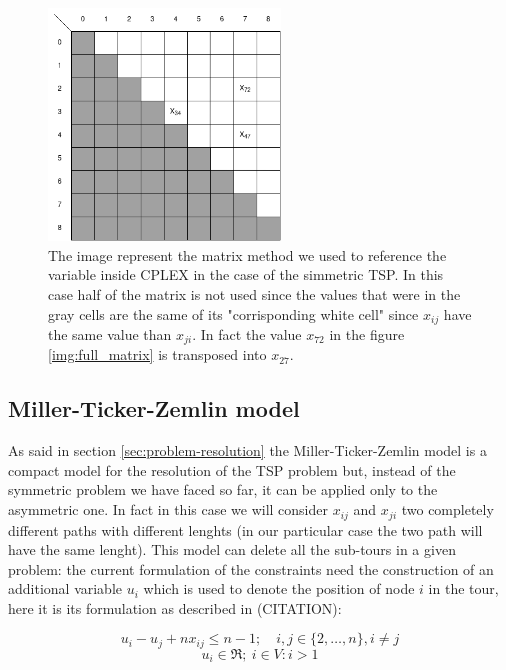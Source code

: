 \begin{figure}[h]
	\centering
	\includegraphics[width=0.55\textwidth]{images/full_matrix_simmetric}
	\caption{The image represent the matrix method we used to reference the variable inside CPLEX in the case of the simmetric TSP. In this case half of the matrix is not used since the values that were in the gray cells are the same of its "corrisponding white cell" since $x_{ij}$ have the same value than $x_{ji}$. In fact the value $x_{72}$ in the figure \ref{img:full_matrix} is transposed into $x_{27}$.}
	\label{img:full_matrix_simm}
\end{figure}

\subsection{Miller-Ticker-Zemlin model}
\label{sec:mtz}
As said in section \ref{sec:problem-resolution} the Miller-Ticker-Zemlin model is a compact model for the resolution of the TSP problem but, instead of the symmetric problem we have faced so far, it can be applied only to the asymmetric one. In fact in this case we will consider $x_{ij}$ and $x_{ji}$ two completely different paths with different lenghts (in our particular case the two path will have the same lenght). This model can delete all the sub-tours in a given problem: the current formulation of the constraints need the construction of an additional variable $u_i$ which is used to denote the position of node $i$ in the tour, here it is its formulation as described in (CITATION):

\begin{equation}
\label{eqn:big-m}
	u_i-u_j+nx_{ij}\le n-1; \quad i,j\in \{2, \dots, n\}, i \not= j
\end{equation}
\begin{equation}
	\label{eqn:u-bound}
	u_i \in \Re; \: i \in V:i>1
\end{equation}

